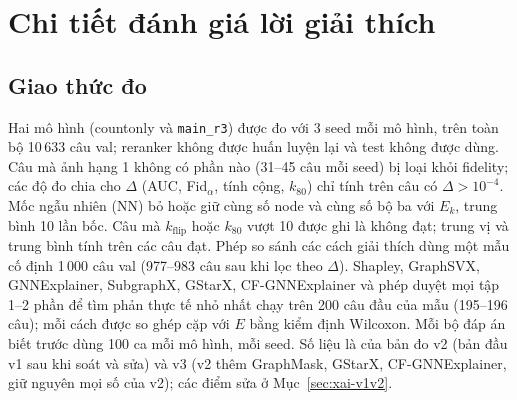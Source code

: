 \section{Chi tiết đánh giá lời giải thích}\label{app:xai}

\subsection{Giao thức đo}\label{sec:xai-protocol}
Hai mô hình (countonly và \texttt{main\_r3}) được đo với 3 seed mỗi mô hình, trên toàn bộ 10\,633 câu val; reranker không
được huấn luyện lại và test không được dùng. Câu mà ảnh hạng 1 không có phần nào (31--45 câu mỗi seed) bị loại khỏi
fidelity; các độ đo chia cho $\Delta$ (AUC, Fid$_{\alpha}$, tính cộng, $k_{80}$) chỉ tính trên câu có $\Delta>10^{-4}$. Mốc
ngẫu nhiên (NN) bỏ hoặc giữ cùng số node và cùng số bộ ba với $E_k$, trung bình 10 lần bốc. Câu mà $k_{\text{flip}}$ hoặc
$k_{80}$ vượt 10 được ghi là không đạt; trung vị và trung bình tính trên các câu đạt.
Phép so sánh các cách giải thích dùng một mẫu cố định 1\,000 câu val (977--983 câu sau khi lọc theo $\Delta$). Shapley,
GraphSVX, GNNExplainer, SubgraphX, GStarX, CF-GNNExplainer và phép duyệt mọi tập 1--2 phần để tìm phản thực tế nhỏ nhất chạy
trên 200 câu đầu của mẫu (195--196 câu); mỗi cách được so ghép cặp với $E$ bằng kiểm định Wilcoxon. Mỗi bộ đáp án biết trước
dùng 100 ca mỗi mô hình, mỗi seed. Số liệu là của bản đo v2 (bản đầu v1 sau khi soát và sửa) và v3 (v2 thêm GraphMask,
GStarX, CF-GNNExplainer, giữ nguyên mọi số của v2); các điểm sửa ở Mục~\ref{sec:xai-v1v2}.

